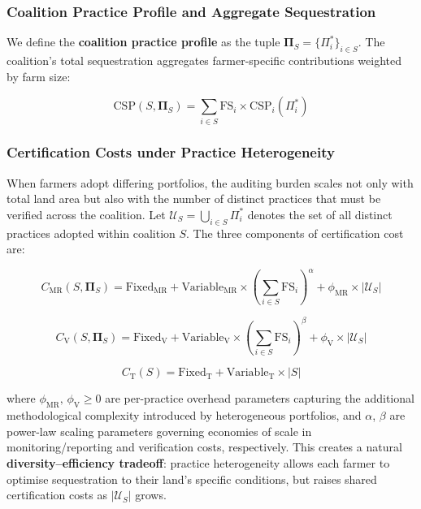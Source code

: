 \documentclass[manuscript, screen]{acmart}
\begin{document}
\subsubsection*{Coalition Practice Profile and Aggregate Sequestration}

We define the \textbf{coalition practice profile} as the tuple
$\boldsymbol{\Pi}_S = \{\Pi_i^*\}_{i \in S}$. The coalition's total
sequestration aggregates farmer-specific contributions weighted by farm size:

\begin{equation}
    \text{CSP}(S, \boldsymbol{\Pi}_S) = \sum_{i \in S} \text{FS}_i \times \text{CSP}_i(\Pi_i^*)
\end{equation}

\subsubsection*{Certification Costs under Practice Heterogeneity}

When farmers adopt differing portfolios, the auditing burden scales not only
with total land area but also with the number of distinct practices that must
be verified across the coalition. Let $\mathcal{U}_S = \bigcup_{i \in S}
\Pi_i^*$ denotes the set of all distinct practices adopted within coalition $S$.
The three components of certification cost are:

\begin{equation}
    C_{\text{MR}}(S, \boldsymbol{\Pi}_S) = \text{Fixed}_{\text{MR}}
    + \text{Variable}_{\text{MR}} \times \left(\sum_{i \in S} \text{FS}_i\right)^{\!\alpha}
    + \phi_{\text{MR}} \times |\mathcal{U}_S|
\end{equation}

\begin{equation}
    C_{\text{V}}(S, \boldsymbol{\Pi}_S) = \text{Fixed}_{\text{V}}
    + \text{Variable}_{\text{V}} \times \left(\sum_{i \in S} \text{FS}_i\right)^{\!\beta}
    + \phi_{\text{V}} \times |\mathcal{U}_S|
\end{equation}

\begin{equation}
    C_{\text{T}}(S) = \text{Fixed}_{\text{T}} + \text{Variable}_{\text{T}} \times |S|
\end{equation}

where $\phi_{\text{MR}},\, \phi_{\text{V}} \geq 0$ are per-practice overhead
parameters capturing the additional methodological complexity introduced by
heterogeneous portfolios, and $\alpha$, $\beta$ are power-law scaling
parameters governing economies of scale in monitoring/reporting and
verification costs, respectively. This creates a natural
\textbf{diversity--efficiency tradeoff}: practice heterogeneity allows each
farmer to optimise sequestration to their land's specific conditions, but
raises shared certification costs as $|\mathcal{U}_S|$ grows.
\end{document}
